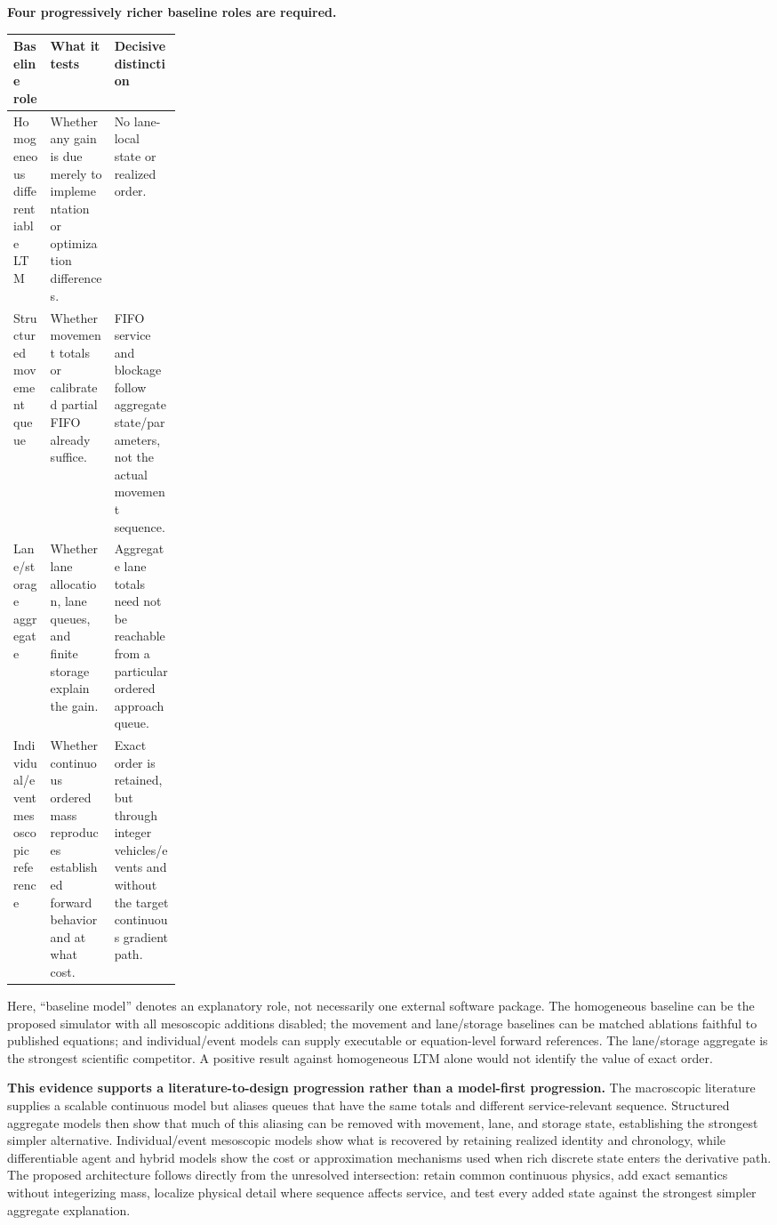 \documentclass[10pt,a4paper]{article}
\begin{document}
\textbf{Four progressively richer baseline roles are required.}

\begin{tabularx}{\textwidth}{p{0.22\linewidth}YY}
\toprule
\textbf{Baseline role} & \textbf{What it tests} & \textbf{Decisive distinction}\\
\midrule
Homogeneous differentiable LTM & Whether any gain is due merely to implementation or optimization differences. & No lane-local state or realized order.\\
Structured movement queue & Whether movement totals or calibrated partial FIFO already suffice. & FIFO service and blockage follow aggregate state/parameters, not the actual movement sequence.\\
Lane/storage aggregate & Whether lane allocation, lane queues, and finite storage explain the gain. & Aggregate lane totals need not be reachable from a particular ordered approach queue.\\
Individual/event mesoscopic reference & Whether continuous ordered mass reproduces established forward behavior and at what cost. & Exact order is retained, but through integer vehicles/events and without the target continuous gradient path.\\
\bottomrule
\end{tabularx}

Here, ``baseline model'' denotes an explanatory role, not necessarily one external software package. The homogeneous baseline can be the proposed simulator with all mesoscopic additions disabled; the movement and lane/storage baselines can be matched ablations faithful to published equations; and individual/event models can supply executable or equation-level forward references. The lane/storage aggregate is the strongest scientific competitor. A positive result against homogeneous LTM alone would not identify the value of exact order.

\textbf{This evidence supports a literature-to-design progression rather than a model-first progression.} The macroscopic literature supplies a scalable continuous model but aliases queues that have the same totals and different service-relevant sequence. Structured aggregate models then show that much of this aliasing can be removed with movement, lane, and storage state, establishing the strongest simpler alternative. Individual/event mesoscopic models show what is recovered by retaining realized identity and chronology, while differentiable agent and hybrid models show the cost or approximation mechanisms used when rich discrete state enters the derivative path. The proposed architecture follows directly from the unresolved intersection: retain common continuous physics, add exact semantics without integerizing mass, localize physical detail where sequence affects service, and test every added state against the strongest simpler aggregate explanation.
\end{document}
